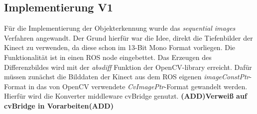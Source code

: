 					
		\subsection{Implementierung V1}
		Für die Implementierung der Objekterkennung wurde das \textit{sequential images} Verfahren angewandt. Der Grund hierfür war die Idee, direkt die Tiefenbilder der Kinect zu verwenden, da diese schon im 13-Bit Mono Format vorliegen. Die Funktionalität ist in einen ROS node eingebettet. Das Erzeugen des Differenzbildes wird mit der \textit{absdiff} Funktion der OpenCV-library erreicht. Dafür müssen zunächst die Bilddaten der Kinect aus dem ROS eigenen \textit{imageConstPtr}-Format in das von OpenCV verwendete \textit{CvImagePtr}-Format gewandelt werden. Hierfür wird die Konverter middleware cvBridge genutzt. \textbf{(ADD)Verweiß auf cvBridge in Vorarbeiten(ADD)}\\
		
